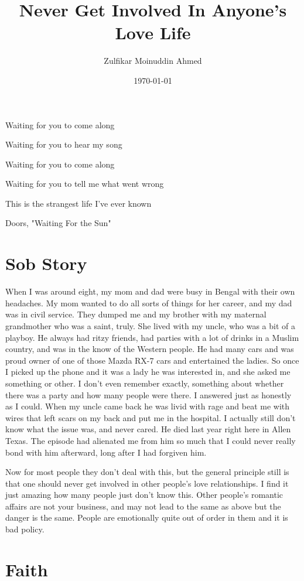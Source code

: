 \documentclass{amsart}
\title{Never Get Involved In Anyone's Love Life}
\author{Zulfikar Moinuddin Ahmed}
\date{\today}
\begin{document}
\maketitle
\epigraph{
Waiting for you to come along

Waiting for you to hear my song

Waiting for you to come along

Waiting for you to tell me what went wrong

This is the strangest life I've ever known
}{Doors, "Waiting For the Sun"}

\section{Sob Story}
When I was around eight, my mom and dad were busy in Bengal with their own headaches.  My mom wanted to do all sorts of things for her career, and my dad was in civil service.  They dumped me and my brother with my maternal grandmother who was a saint, truly.  She lived with my uncle, who was a bit of a playboy.  He always had ritzy friends, had parties with a lot of drinks in a Muslim country, and was in the know of the Western people.  He had many cars and was proud owner of one of those Mazda RX-7 cars and entertained the ladies.  So once I picked up the phone and it was a lady he was interested in, and she asked me something or other.  I don't even remember exactly, something about whether there was a party and how many people were there.  I answered just as honestly as I could.  When my uncle came back he was livid with rage and beat me with wires that left scars on my back and put me in the hospital.  I actually still don't know what the issue was, and never cared.  He died last year right here in Allen Texas.  The episode had alienated me from him so much that I could never really bond with him afterward, long after I had forgiven him.

Now for most people they don't deal with this, but the general principle still is that one should never get involved in other people's love relationships.  I find it just amazing how many people just don't know this.  Other people's romantic affairs are not your business, and may not lead to the same as above but the danger is the same.  People are emotionally quite out of order in them and it is bad policy.

\section{Faith}
\end{document}

